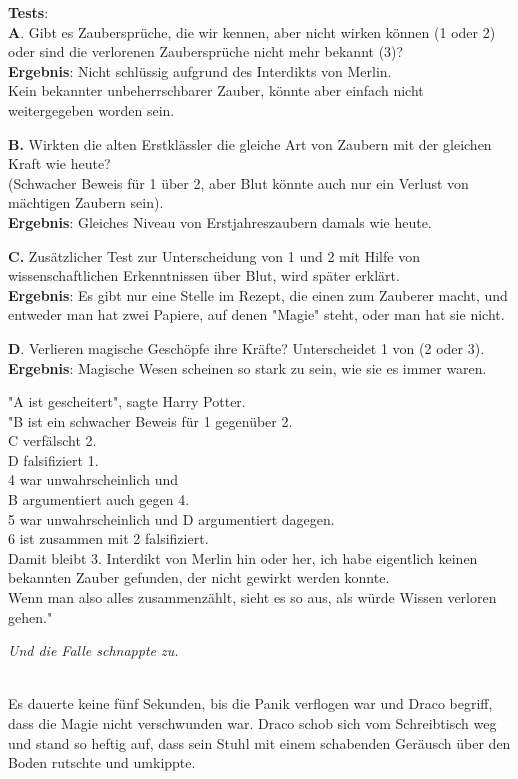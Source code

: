 {\textbf{Tests}:\\ \textbf{A}. Gibt es Zaubersprüche, die wir kennen, aber nicht wirken können (1 oder 2) oder sind die verlorenen Zaubersprüche nicht mehr bekannt (3)?\\ \textbf{Ergebnis}: Nicht schlüssig aufgrund des Interdikts von Merlin.\\ Kein bekannter unbeherrschbarer Zauber, könnte aber einfach nicht weitergegeben worden sein.

\textbf{B.} Wirkten die alten Erstklässler die gleiche Art von Zaubern mit der gleichen Kraft wie heute?\\ (Schwacher Beweis für 1 über 2, aber Blut könnte auch nur ein Verlust von mächtigen Zaubern sein).\\ \textbf{Ergebnis}: Gleiches Niveau von Erstjahreszaubern damals wie heute.

\textbf{C.} Zusätzlicher Test zur Unterscheidung von 1 und 2 mit Hilfe von wissenschaftlichen Erkenntnissen über Blut, wird später erklärt.\\ \textbf{Ergebnis}: Es gibt nur eine Stelle im Rezept, die einen zum Zauberer macht, und entweder man hat zwei Papiere, auf denen "Magie" steht, oder man hat sie nicht.

\textbf{D}. Verlieren magische Geschöpfe ihre Kräfte? Unterscheidet 1 von (2 oder 3). \textbf{Ergebnis}: Magische Wesen scheinen so stark zu sein, wie sie es immer waren.

"A ist gescheitert", sagte Harry Potter.\\ "B ist ein schwacher Beweis für 1 gegenüber 2.\\ C verfälscht 2.\\ D falsifiziert 1.\\ 4 war unwahrscheinlich und\\ B argumentiert auch gegen 4.\\ 5 war unwahrscheinlich und D argumentiert dagegen.\\ 6 ist zusammen mit 2 falsifiziert.\\ Damit bleibt 3. Interdikt von Merlin hin oder her, ich habe eigentlich keinen bekannten Zauber gefunden, der nicht gewirkt werden konnte.\\ Wenn man also alles zusammenzählt, sieht es so aus, als würde Wissen verloren gehen."

\emph{Und die Falle schnappte zu.\\ }\strut \\ Es dauerte keine fünf Sekunden, bis die Panik verflogen war und Draco begriff, dass die Magie nicht verschwunden war. Draco schob sich vom Schreibtisch weg und stand so heftig auf, dass sein Stuhl mit einem schabenden Geräusch über den Boden rutschte und umkippte.

}
